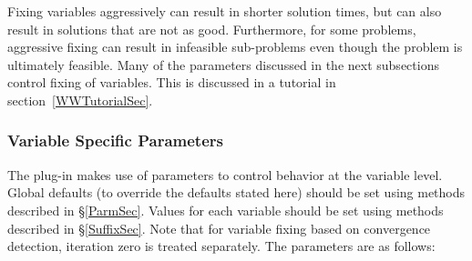 Fixing variables aggressively can result in shorter solution times, but can also
result in solutions that are not as good. Furthermore, for some problems,
aggressive fixing can result in infeasible sub-problems even though the problem
is ultimately feasible. Many of the parameters discussed in the next subsections
control fixing of variables. This is discussed in a tutorial in
section~\ref{WWTutorialSec}.

\subsubsection{Variable Specific Parameters}

The plug-in makes use of parameters to control behavior at the variable level.
Global defaults (to override the defaults stated here) should be set using
methods described in \S\ref{ParmSec}. Values for each variable should be set
using methods described in \S\ref{SuffixSec}. Note that for variable fixing
based on convergence detection, iteration zero is treated separately. The
parameters are as follows:

